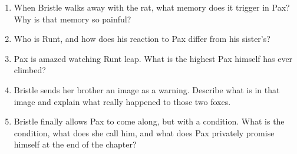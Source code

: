 \documentclass[11pt]{article}
\begin{document}
\begin{enumerate}
  \vspace{8pt}
  \item When Bristle walks away with the rat, what memory does it trigger in Pax? Why is that memory so painful?
  \vspace{0.85in}
  \item Who is Runt, and how does his reaction to Pax differ from his sister's?
  \vspace{0.85in}
  \item Pax is amazed watching Runt leap. What is the highest Pax himself has ever climbed?
  \vspace{8pt}
  \item Bristle sends her brother an image as a warning. Describe what is in that image and explain what really happened to those two foxes.
  \vspace{0.9in}
  \item Bristle finally allows Pax to come along, but with a condition. What is the condition, what does she call him, and what does Pax privately promise himself at the end of the chapter?
  \vspace{0.9in}
\end{enumerate}
\end{document}
